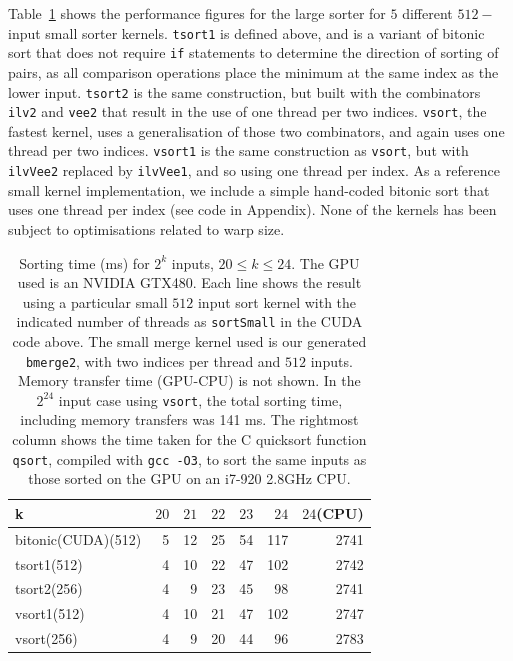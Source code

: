 Table~\ref{tab:expressive-table1} shows the performance figures for the large sorter
for $5$ different $512-$input small sorter kernels.
{\tt tsort1} is defined above, and is a variant of bitonic sort
that does not require {\tt if} statements to determine the direction
of sorting of pairs, as all comparison operations place the minimum at the
same index as the lower input.
{\tt tsort2} is the same construction, but built with the combinators {\tt ilv2}
and {\tt vee2} that result in the use of one thread per two indices.
{\tt vsort}, the fastest kernel, uses a generalisation of those
two combinators, and again uses one thread per two indices.
{\tt vsort1} is the same construction as {\tt vsort}, but with {\tt ilvVee2} replaced
by {\tt ilvVee1}, and so using one thread per index.
As a reference small kernel implementation, we include a simple hand-coded bitonic sort
that uses one thread per index (see code in Appendix).
None of the kernels has been subject to optimisations related to warp size.

%
\begin{table}
\begin{center}
  \begin{tabular}{| l | r | r | r | r | r | r | }
    \hline
        k                             &  $20$ &  $21$ & $22$& $23$ & $24$ & $24$(CPU)  \\ \hline
    bitonic(CUDA)(512)                &  5 & 12 & 25 & 54 & 117 & 2741   \\      
    tsort1(512)                       &  4 & 10 & 22 & 47 & 102 & 2742    \\
    tsort2(256)                       &  4 & 9 & 23 & 45 & 98 & 2741     \\ 
    vsort1(512)                       &  4 & 10 & 21 & 47 & 102 & 2747    \\ 
    vsort(256)                        &  4 & 9 & 20 & 44 & 96 & 2783    \\ 
    \hline
  \end{tabular}
\end{center}
\caption{Sorting time (ms) for $2^k$ inputs, $20 \leq k \leq 24$.  The GPU used is an NVIDIA GTX480.
Each line shows the result using a particular small $512$ input sort kernel with the
indicated number of threads as {\tt sortSmall} in the CUDA code above. The small merge kernel used
is our generated {\tt bmerge2}, with two indices per thread and $512$ inputs. Memory transfer time (GPU-CPU)
is not shown. In the $2^{24}$ input case using {\tt vsort}, the total sorting time, including
memory transfers was 141 ms.
The rightmost column shows the time taken for the C quicksort function {\tt qsort}, compiled with
{\tt gcc -O3}, to sort the same inputs as those sorted on the GPU on an i7-920 2.8GHz CPU.
} 
\label{tab:expressive-table1}
\end{table}

